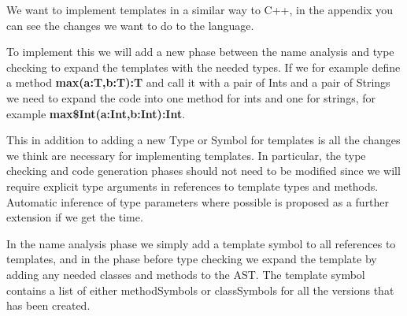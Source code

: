 We want to implement templates in a similar way to C++, in the appendix you can
see the changes we want to do to the language.

To implement this we will add a new phase between the name analysis and type
checking to expand the templates with the needed types. If we for example
define a method \textbf{max(a:T,b:T):T} and call it with a pair of Ints
and a pair of Strings we need to expand the code into one method for ints and
one for strings, for example \textbf{max\$Int(a:Int,b:Int):Int}.

This in addition to adding a new Type or Symbol for templates is all the
changes we think are necessary for implementing templates. In particular, the
type checking and code generation phases should not need to be modified since
we will require explicit type arguments in references to template types and
methods. Automatic inference of type parameters where possible is proposed as a
further extension if we get the time.

In the name analysis phase we simply add a template symbol to all references to
templates, and in the phase before type checking we expand the template by adding
any needed classes and methods to the AST. The template symbol contains a list of
either methodSymbols or classSymbols for all the versions that has been created.

\iffalse
The first thing our compiled does is checking whether the code compiles to
the BNF, this is done in two steps by first tokenizing the code into the
tokens found in our language, and then in the parser check whether the order
of the tokens are in complient with our language. We had to add some rules to
the BNF to make room for templates, the addition can be found in the appendix.
In the next part, name analysis we make sure that the code follows a set of rules
and attatch symbols to all identifiers. After the name analysis we run type
checking where we detect and make sure that all expressions produce the correct
type. To make this part work with templates we have to expand all templates
befor we run the type checking, and modify the symbols slighetly.
\fi
